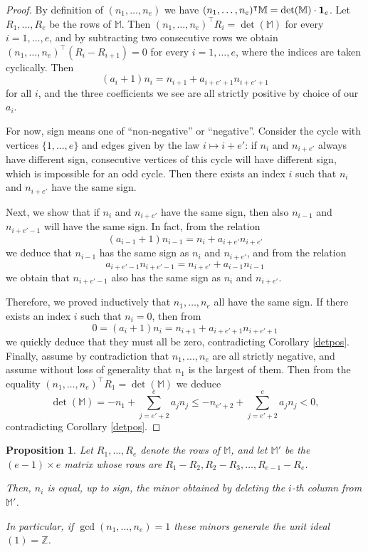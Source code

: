 \documentclass[11pt,twoside]{amsart}
\newcommand{\Z}{\mathbb Z}
\newcommand{\MM}{\mathbb M}
\def\bbM{{\mathbb M}}
\newtheorem{prop}[Theorem]{Proposition}
\theoremstyle{definition}
\numberwithin{equation}{section}
\begin{document}
\begin{proof}
By definition of $(n_1,\ldots,n_e)$ we have $(n_1,\ldots,n_e)^\intercal \bbM = \det(\MM) \cdot {\bf 1}_e$. Let $R_1,\ldots,R_e$ be the rows of $\MM$. Then $(n_1,\ldots,n_e)^\intercal R_i = \det(\MM)$ for every $i=1,\ldots,e$, and by subtracting two consecutive rows we obtain $(n_1,\ldots,n_e)^\intercal (R_i-R_{i+1})=0$ for every $i=1,\ldots,e$, where the indices are taken cyclically. Then
 $$(a_i+1) n_i = n_{i+1}+ a_{i+e'+1} n_{i+e'+1}$$    for all $i$, and the three coefficients we see are all strictly positive by choice of our $a_i$.

For now, sign means one of ``non-negative'' or ``negative''. 
Consider the cycle with vertices $\{1,\ldots,e\}$ and edges given by the law $i \mapsto i+e'$: if $n_i$ and $n_{i+e'}$ always have different sign, consecutive vertices of this cycle will have different sign, which is impossible for an odd cycle. Then there exists an index $i$ such that $n_i$ and $n_{i+e'}$ have the same sign.

Next, we show that if $n_i$ and $n_{i+e'}$ have the same sign, then also $n_{i-1}$ and $n_{i+e'-1}$ will have the same sign. In fact, from the relation $$(a_{i-1}+1)n_{i-1} = n_i + a_{i+e'}n_{i+e'}$$ we deduce that $n_{i-1}$ has the same sign as $n_i$ and $n_{i+e'}$, and from the relation
$$a_{i+e'-1}n_{i+e'-1} = n_{i+e'}+a_{i-1}n_{i-1}$$
we obtain that $n_{i+e'-1}$ also has the same sign as $n_i$ and $n_{i+e'}$.

Therefore, we proved inductively that $n_1,\ldots,n_e$ all have the same sign. If there exists an index $i$ such that $n_i=0$, then from
$$0=(a_i+1)n_i=n_{i+1}+a_{i+e'+1}n_{i+e'+1}$$
we quickly deduce that they must all be zero, contradicting Corollary \ref{detpos}.
Finally, assume by contradiction that $n_1,\ldots,n_e$ are all strictly negative, and assume without loss of generality that $n_1$ is the largest of them. Then from the equality $(n_1,\ldots,n_e)^\intercal R_1 = \det(\MM) $ we deduce
$$\det(\bbM)=-n_1 + \sum_{j=e'+2}^e a_jn_j \le -n_{e'+2} + \sum_{j=e'+2}^e a_jn_j < 0,$$
contradicting Corollary \ref{detpos}.
\end{proof}
\begin{prop}
Let $R_1, \ldots, R_e$ denote the rows of $\MM$, and 
let $\MM'$ be the $(e-1)\times e$ matrix whose rows are 
$R_1-R_2, R_2-R_3, \ldots, R_{e-1}-R_e$.

Then, $n_{i}$ is equal, up to sign, the minor obtained by deleting the $i$-th column from $\MM'$.

In particular, if $\gcd(n_1,\ldots,n_e)=1$ these minors generate the unit ideal $(1) = \Z$.
\end{prop}
\end{document}
